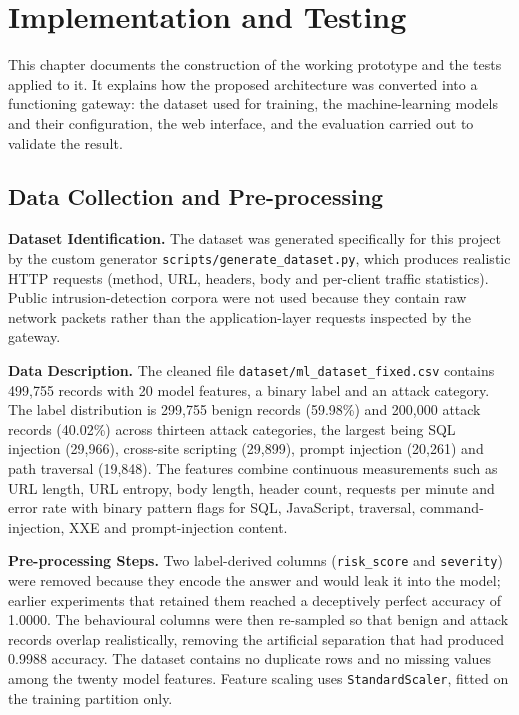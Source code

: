 
\chapter{Implementation and Testing}

This chapter documents the construction of the working prototype and the tests applied to it. It explains how the proposed architecture was converted into a functioning gateway: the dataset used for training, the machine-learning models and their configuration, the web interface, and the evaluation carried out to validate the result.

\section{Data Collection and Pre-processing}

\textbf{Dataset Identification.} The dataset was generated specifically for this project by the custom generator \texttt{scripts/generate\_dataset.py}, which produces realistic HTTP requests (method, URL, headers, body and per-client traffic statistics). Public intrusion-detection corpora were not used because they contain raw network packets rather than the application-layer requests inspected by the gateway.

\textbf{Data Description.} The cleaned file \texttt{dataset/ml\_dataset\_fixed.csv} contains 499,755 records with 20 model features, a binary label and an attack category. The label distribution is 299,755 benign records (59.98\%) and 200,000 attack records (40.02\%) across thirteen attack categories, the largest being SQL injection (29,966), cross-site scripting (29,899), prompt injection (20,261) and path traversal (19,848). The features combine continuous measurements such as URL length, URL entropy, body length, header count, requests per minute and error rate with binary pattern flags for SQL, JavaScript, traversal, command-injection, XXE and prompt-injection content.

\textbf{Pre-processing Steps.} Two label-derived columns (\texttt{risk\_score} and \texttt{severity}) were removed because they encode the answer and would leak it into the model; earlier experiments that retained them reached a deceptively perfect accuracy of 1.0000. The behavioural columns were then re-sampled so that benign and attack records overlap realistically, removing the artificial separation that had produced 0.9988 accuracy. The dataset contains no duplicate rows and no missing values among the twenty model features. Feature scaling uses \texttt{StandardScaler}, fitted on the training partition only.

